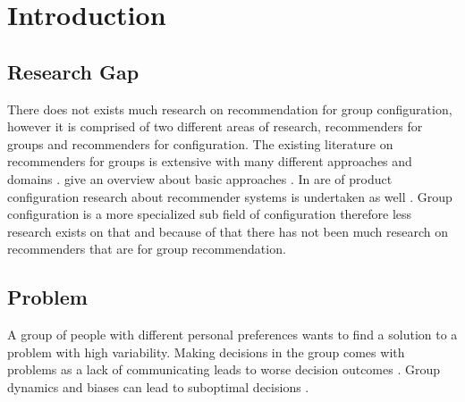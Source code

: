 \chapter{Introduction}
\label{ch:Introduction}

\section{Research Gap}
\label{sec:Introduction:ResearchGap}

There does not exists much research on recommendation for group configuration, however it is comprised of two different areas of research, recommenders for groups and recommenders for configuration.
The existing literature on recommenders for groups is extensive with many different approaches and domains \cite{delicResearchMethodsGroup2016, chenInterfaceInteractionDesign2011, atasItemRecommendationUsing2017, jamesonRecommendationGroups2007, chenEmpatheticonsDesigningEmotion2014, liuCGSPAComprehensiveGroup2019}. \citeauthor{felfernigGroupRecommenderSystems2018} give an overview about basic approaches \cite{felfernigGroupRecommenderSystems2018}.
In are of product configuration research about recommender systems is undertaken as well \cite{pereiraFeatureBasedPersonalizedRecommender2016, scholzConfigurationbasedRecommenderSystem2017, scholzEffectsDecisionSpace2017}.
Group configuration is a more specialized sub field of configuration therefore less research exists on that and because of that there has not been much research on recommenders that are for group recommendation. 


\section{Problem}
\label{sec:Introduction:Problem}

A group of people with different personal preferences wants to find a solution to a problem with high variability. Making decisions in the group comes with problems as a lack of communicating leads to worse decision outcomes \cite{atasItemRecommendationUsing2017}. Group dynamics and biases can lead to suboptimal decisions \cite{kerrBiasJudgmentComparing1996}. 

